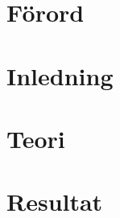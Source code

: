 \documentclass[a4wide,draft,twoside]{article}
\begin{document}

\newpage

\pagestyle{plain}
\section*{Förord}

\newpage

\tableofcontents
\newpage
\pagestyle{fancier}

\section{Inledning}
\newpage

\section{Teori}



\newpage

\section{Resultat}
%
\newpage

\pagestyle{plain}


\newpage

\appendix
\end{document}
